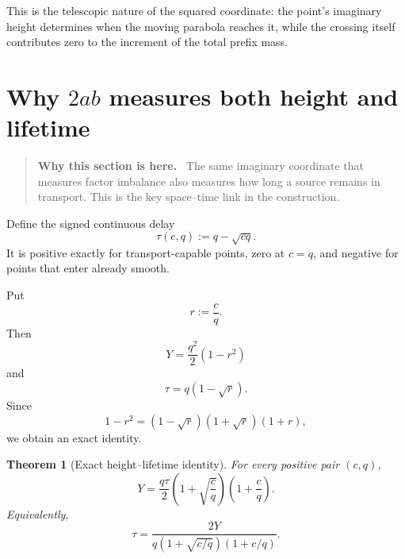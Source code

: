 \documentclass[11pt]{article}
\newtheorem{theorem}{Theorem}[section]
\theoremstyle{definition}
\theoremstyle{remark}
\newcommand{\1}{\mathbf{1}}
\newenvironment{motivation}
  {\begin{quote}\small\color{ovvogray}\textbf{Why this section is here.}\ }
  {\end{quote}}
\begin{document}
This is the telescopic nature of the squared coordinate: the point's imaginary height determines when the moving parabola reaches it, while the crossing itself contributes zero to the increment of the total prefix mass.

\section{Why $2ab$ measures both height and lifetime}
\label{sec:lifetime-law}

\begin{motivation}
The same imaginary coordinate that measures factor imbalance also measures how long a source remains in transport.  This is the key space--time link in the construction.
\end{motivation}

Define the signed continuous delay
\begin{equation}
 \tau(c,q):=q-\sqrt{cq}.
 \label{eq:tau}
\end{equation}
It is positive exactly for transport-capable points, zero at $c=q$, and negative for points that enter already smooth.

Put
\begin{equation}
 r:=\frac cq.
 \label{eq:r-ratio}
\end{equation}
Then
\begin{equation}
 Y=\frac{q^2}{2}(1-r^2)
 \label{eq:Y-r}
\end{equation}
and
\begin{equation}
 \tau=q(1-\sqrt r).
 \label{eq:tau-r}
\end{equation}
Since
\begin{equation}
 1-r^2=(1-\sqrt r)(1+\sqrt r)(1+r),
 \label{eq:factor-r}
\end{equation}
we obtain an exact identity.

\begin{theorem}[Exact height--lifetime identity]
\label{thm:exact-height-lifetime}
For every positive pair $(c,q)$,
\begin{equation}
 \boxed{
 Y
 =
 \frac{q\tau}{2}
 \left(1+\sqrt{\frac cq}\right)
 \left(1+\frac cq\right).
 }
 \label{eq:Y-tau-exact}
\end{equation}
Equivalently,
\begin{equation}
 \boxed{
 \tau
 =
 \frac{2Y}
 {q\left(1+\sqrt{c/q}\right)\left(1+c/q\right)}.
 }
 \label{eq:tau-Y-exact}
\end{equation}
\end{theorem}
\end{document}
